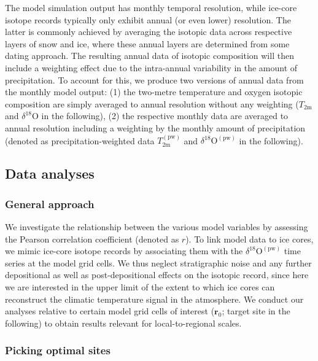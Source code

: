 \documentclass[cp, manuscript]{copernicus}
\begin{document}
The model simulation output has monthly temporal resolution, while ice-core
isotope records typically only exhibit annual (or even lower) resolution. The
latter is commonly achieved by averaging the isotopic data across respective
layers of snow and ice, where these annual layers are determined from some
dating approach. The resulting annual data of isotopic composition will then
include a weighting effect due to the intra-annual variability in the amount of
precipitation. To account for this, we produce two versions of annual data from
the monthly model output: (1) the two-metre temperature and oxygen isotopic
composition are simply averaged to annual resolution without any weighting
($T_{2\mathrm{m}}$ and $\delta^{18}\mathrm{O}$ in the following), (2) the
respective monthly data are averaged to annual resolution including a weighting
by the monthly amount of precipitation (denoted as precipitation-weighted data
$T_{2\mathrm{m}}^{\mathrm{(pw)}}$ and $\delta^{18}\mathrm{O}^{\mathrm{(pw)}}$ in
the following).

\subsection{Data analyses}\label{methods:main}

\subsubsection{General approach}\label{methods:general}

We investigate the relationship between the various model variables by assessing
the Pearson correlation coefficient (denoted as $r$). To link model data to ice
cores, we mimic ice-core isotope records by associating them with the
$\delta^{18}\mathrm{O}^{\mathrm{(pw)}}$ time series at the model grid cells. We
thus neglect stratigraphic noise and any further depositional as well as
post-depositional effects on the isotopic record, since here we are interested
in the upper limit of the extent to which ice cores can reconstruct the climatic
temperature signal in the atmosphere. We conduct our analyses relative to
certain model grid cells of interest ($\mathbf{r}_0$; target site in the
following) to obtain results relevant for local-to-regional scales.

\subsubsection{Picking optimal sites}\label{methods:picking}
\end{document}
